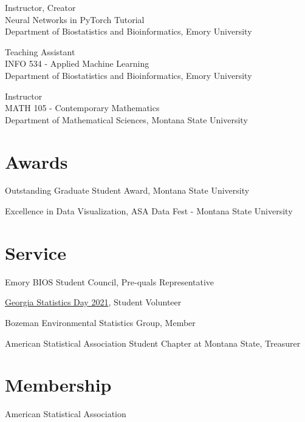 \documentclass{wm_cv}
\begin{document}
Instructor, Creator \hfill {} \\ 
    \indent \quad Neural Networks in PyTorch Tutorial \\
   \indent \quad Department of Biostatistics and Bioinformatics, Emory University

Teaching Assistant \hfill {} \\ 
    \indent \quad INFO 534 - Applied Machine Learning  \\
   \indent \quad Department of Biostatistics and Bioinformatics, Emory University

Instructor \hfill {} \\ 
    \indent \quad MATH 105 - Contemporary Mathematics  \\
   \indent \quad Department of Mathematical Sciences, Montana State University


\section{Awards}

Outstanding Graduate Student Award, Montana State University \hfill {}  

Excellence in Data Visualization, ASA Data Fest - Montana State University \hfill  {}



\section{Service}

Emory BIOS Student Council, Pre-quals Representative \hfill  {}

\href{https://www.stat.uga.edu/events/content/2021/georgia-statistics-day-2021}{Georgia Statistics Day 2021}, Student Volunteer \hfill  {}

Bozeman Environmental Statistics Group, Member \hfill  {}

American Statistical Association Student Chapter at Montana State, Treasurer \hfill  {}

\section{Membership}

American Statistical Association \\
\end{document}
